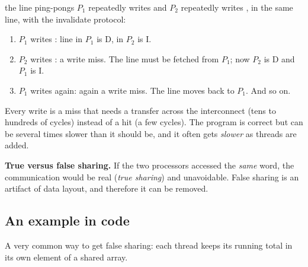 \begin{center}
\end{center}

\begin{workedex}{the line ping-pongs}
$P_1$ repeatedly writes  and $P_2$ repeatedly writes , in the same line, with the invalidate protocol:
\begin{enumerate}
  \item $P_1$ writes : line in $P_1$ is D, in $P_2$ is I.
  \item $P_2$ writes : a write miss. The line must be fetched from $P_1$; now $P_2$ is D and $P_1$ is I.
  \item $P_1$ writes  again: again a write miss. The line moves back to $P_1$. And so on.
\end{enumerate}
Every write is a miss that needs a transfer across the interconnect (tens to hundreds of cycles) instead of a hit
(a few cycles). The program is correct but can be several times slower than it should be, and it often gets \emph{slower} as threads are added.
\end{workedex}

\textbf{True versus false sharing.} If the two processors accessed the \emph{same} word, the communication would be real
(\emph{true sharing}) and unavoidable. False sharing is an artifact of data layout, and therefore it can be removed.

\subsection{An example in code}

A very common way to get false sharing: each thread keeps its running total in its own element of a shared array.

